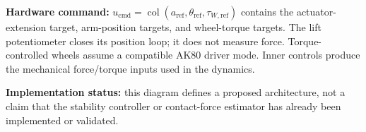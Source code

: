 \documentclass[10pt,a4paper]{article}
\newcommand{\col}{\operatorname{col}}
\begin{document}
\begin{landscape}
\textbf{Hardware command:}
$u_{\mathrm{cmd}}=\col(a_{\mathrm{ref}},\theta_{\mathrm{ref}},\tau_{W,\mathrm{ref}})$ contains the actuator-extension target, arm-position targets, and wheel-torque targets. The lift potentiometer closes its position loop; it does not measure force. Torque-controlled wheels assume a compatible AK80 driver mode. Inner controls produce the mechanical force/torque inputs used in the dynamics.

\textbf{Implementation status:} this diagram defines a proposed architecture, not a claim that the stability controller or contact-force estimator has already been implemented or validated.
\end{landscape}
\end{document}
